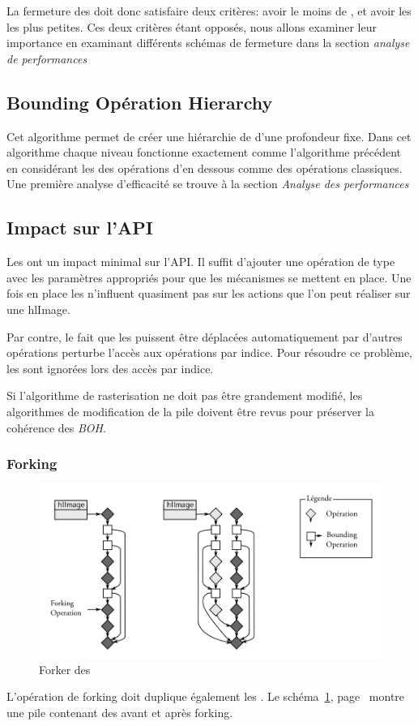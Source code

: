 			La fermeture des \BO doit donc satisfaire deux critères: avoir le moins de \BO, et avoir les \BO les plus petites. 
			Ces deux critères étant opposés, nous allons examiner leur importance en examinant différents schémas de fermeture
			dans la section \emph{analyse de performances}
			

		\subsection{Bounding Opération Hierarchy}
			Cet algorithme permet de créer une hiérarchie de \BO d'une profondeur fixe. Dans cet algorithme chaque niveau
			fonctionne exactement comme l'algorithme précédent en considérant les \BO des opérations d'en dessous comme
			des opérations classiques. Une première analyse d'efficacité se trouve à la section \emph{Analyse des performances}


		\subsection{Impact sur l'API}
			Les \BO ont un impact minimal sur l'API. Il suffit d'ajouter une opération de type \BO avec les paramètres
			appropriés pour que les mécanismes se mettent en place. Une fois en place les \BO n'influent quasiment pas
			sur les actions que l'on peut réaliser sur une hlImage. 

			Par contre, le fait que les \BO puissent être déplacées automatiquement par d'autres opérations perturbe
			l'accès aux opérations par indice. Pour résoudre ce problème, les \BO sont ignorées lors des accès par
			indice. 

			Si l'algorithme de rasterisation ne doit pas être grandement modifié, les algorithmes de modification
			de la pile doivent être revus pour préserver la cohérence des \emph{BOH}.

			\subsubsection{Forking}
			\begin{figure}[ht]
				\centering
				\includegraphics[width=\textwidth]{images/bo-forking} 
				\caption{Forker des \BO}
				\label{fig:bo-forking}
			\end{figure}
			L'opération de forking doit duplique également les \BO. Le schéma~\ref{fig:bo-forking}, page~\pageref{fig:bo-forking} montre une pile
			contenant des \BO avant et après forking. 

